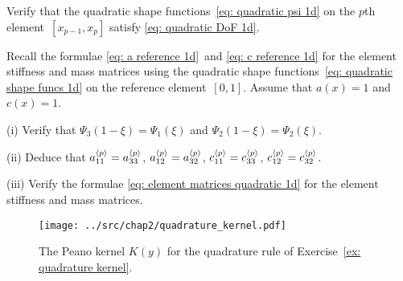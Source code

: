 \begin{Exercises}
\exercise\label{ex: quadratic DoF 1d}
Verify that the quadratic shape functions~\eqref{eq: quadratic psi 1d} on the 
$p$th element~$[x_{p-1},x_p]$ satisfy \eqref{eq: quadratic DoF 1d}.

\exercise
Recall the formulae \eqref{eq: a reference 1d}~and
\eqref{eq: c reference 1d} for the element stiffness and mass matrices using 
the quadratic shape functions~\eqref{eq: quadratic shape funcs 1d} on the 
reference element~$[0,1]$.  Assume that $a(x)=1$ and $c(x)=1$.
\begin{description}
\item{(i)} Verify that $\Psi_3(1-\xi)=\Psi_1(\xi)$ and 
$\Psi_2(1-\xi)=\Psi_2(\xi)$.
\item{(ii)} Deduce that
$a^{\langle p\rangle}_{11}=a^{\langle p\rangle}_{33}$, $a^{\langle p\rangle}_{12}=a^{\langle p\rangle}_{32}$,
$c^{\langle p\rangle}_{11}=c^{\langle p\rangle}_{33}$, $c^{\langle p\rangle}_{12}=c^{\langle p\rangle}_{32}$.
\item{(iii)} Verify the formulae \eqref{eq: element matrices quadratic 1d}
for the element stiffness and mass matrices.
\end{description}

\begin{figure}
\caption{The Peano kernel $K(y)$ for the quadrature rule of 
Exercise~\ref{ex: quadrature kernel}.}\label{fig: quadrature kernel}
\begin{center}
\texttt{[image: ../src/chap2/quadrature\_kernel.pdf]}
\end{center}
\end{figure}


\end{Exercises}
